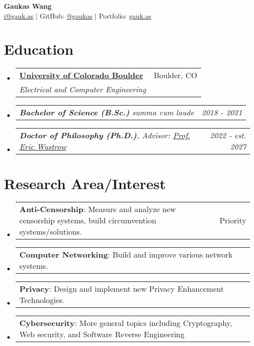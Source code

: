 \documentclass[letterpaper,11pt]{article}
\makeatletter
\newcommand{\resumeSubheading}[4]{
  \vspace{-2pt}\item
    \begin{tabular*}{0.97\textwidth}[t]{l@{\extracolsep{\fill}}r}
      \textbf{#1} & #2 \\
      \textit{\small#3} & \textit{\small #4} \\
    \end{tabular*}\vspace{-7pt}
}
\newcommand{\resumeSubSubheading}[2]{
    \item
    \begin{tabular*}{0.97\textwidth}{l@{\extracolsep{\fill}}r}
      \textit{\small#1} & \textit{\small #2} \\
    \end{tabular*}\vspace{-7pt}
}
\newcommand{\resumeProjectHeading}[2]{
    \item
    \begin{tabular*}{0.97\textwidth}{l@{\extracolsep{\fill}}r}
      \small#1 & #2 \\
    \end{tabular*}\vspace{-7pt}
}
\newcommand{\resumeSubHeadingListStart}{\begin{itemize}[leftmargin=0.15in, label={}]}
\newcommand{\resumeSubHeadingListEnd}{\end{itemize}}
\makeatother
\begin{document}
\begin{center}
  {\textbf{\Huge Gaukas Wang}} \\ \vspace{4pt}
    \href{mailto: i@gauk.as}{{i@gauk.as}} $|$ 
    GitHub: \href{https://github.com/gaukas}{@gaukas} $|$ 
    Portfolio: \href{https://gauk.as}{gauk.as}
\end{center}


\section{Education}
\resumeSubHeadingListStart
\resumeSubheading
{\href{https://colorado.edu}{University of Colorado Boulder}}{Boulder, CO}
{Electrical and Computer Engineering}{}
\resumeSubSubheading
{
  \em{\textbf{Bachelor of Science (B.Sc.)}} \textit{summa cum laude}
}{2018 - 2021}
\resumeSubSubheading
{
  \em{}\textbf{Doctor of Philosophy (Ph.D.)}, 
  {Advisor: \href{https://ericw.us/trow}{Prof. Eric Wustrow}}
}{2022 - est. 2027}
\resumeSubHeadingListEnd

\vspace{1pt}

\section{Research Area/Interest}
\resumeSubHeadingListStart
  \resumeProjectHeading {\textbf{Anti-Censorship}: Measure and analyze new censorship systems, build circumvention systems/solutions.}{Priority}
  \resumeProjectHeading {\textbf{Computer Networking}: Build and improve various network systems.}{}
  \resumeProjectHeading {\textbf{Privacy}: Design and implement new Privacy Enhancement Technologies.}{}
  \resumeProjectHeading {\textbf{Cybersecurity}: More general topics including Cryptography, Web security, and Software Reverse Engineering}{}
\resumeSubHeadingListEnd
\vspace{1pt}

\end{document}
